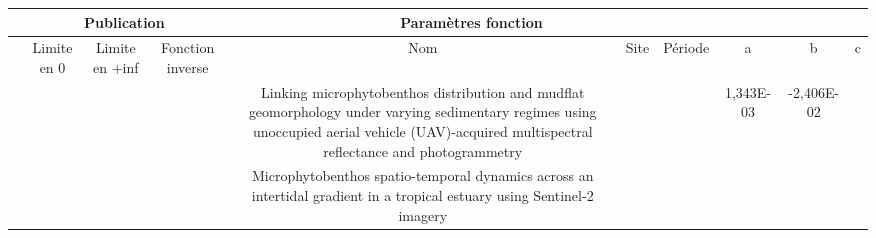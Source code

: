 \documentclass[
  letterpaper,
  DIV=11,
  numbers=noendperiod]{scrartcl}
\begin{document}
\begin{table}[]
\begin{tabular}{|cccc|ccc|ccc|}
\hline
\rowcolor[HTML]{D0CECE} 
\multicolumn{4}{|c|}{\cellcolor[HTML]{D0CECE}Fonction}                                                                                                                                                                      & \multicolumn{3}{c|}{\cellcolor[HTML]{D0CECE}Publication}                                                                                                                                                                                                                                & \multicolumn{3}{c|}{\cellcolor[HTML]{D0CECE}Paramètres fonction}                                                           \\ \hline
\rowcolor[HTML]{D0CECE} 
\multicolumn{1}{|c|}{\cellcolor[HTML]{D0CECE}Forme}          & \multicolumn{1}{c|}{\cellcolor[HTML]{D0CECE}Limite en 0} & \multicolumn{1}{c|}{\cellcolor[HTML]{D0CECE}Limite en +inf} & Fonction inverse                    & \multicolumn{1}{c|}{\cellcolor[HTML]{D0CECE}Nom}                                                                                                                                                                          & \multicolumn{1}{c|}{\cellcolor[HTML]{D0CECE}Site} & Période & \multicolumn{1}{c|}{\cellcolor[HTML]{D0CECE}a} & \multicolumn{1}{c|}{\cellcolor[HTML]{D0CECE}b} & c                        \\ \hline
\multicolumn{1}{|c|}{}                                       & \multicolumn{1}{c|}{}                                    & \multicolumn{1}{c|}{}                                       &                                     & \multicolumn{1}{c|}{Linking   microphytobenthos distribution and mudflat geomorphology under varying   sedimentary regimes using unoccupied aerial vehicle (UAV)-acquired   multispectral reflectance and photogrammetry} & \multicolumn{1}{c|}{}                             &         & \multicolumn{1}{c|}{1,343E-03}                 & \multicolumn{1}{c|}{-2,406E-02}                & \cellcolor[HTML]{F2F2F2} \\ \cline{5-10} 
\multicolumn{1}{|c|}{}                                       & \multicolumn{1}{c|}{}                                    & \multicolumn{1}{c|}{}                                       &                                     & \multicolumn{1}{c|}{Microphytobenthos spatio-temporal dynamics across an intertidal   gradient in a tropical estuary using Sentinel-2 imagery}                                                                            & \multicolumn{1}{c|}{}                             &         & \multicolumn{1}{c|}{}                          & \multicolumn{1}{c|}{}                          & \cellcolor[HTML]{F2F2F2} \\ \cline{5-10} 

\end{tabular}
\end{table}
\end{document}
